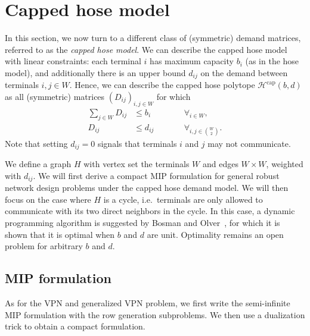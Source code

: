 \section{Capped hose model}
In this section, we now turn to a different class of (symmetric) demand matrices, referred to as the \emph{capped hose model}.
We can describe the capped hose model with linear constraints: each terminal $i$ has maximum capacity $b_i$ (as in the hose model), and additionally there is an upper bound $d_{ij}$ on the demand between terminals $i,j \in W$.
Hence, we can describe the capped hose polytope $\mathcal H^\text{cap}(b, d)$ as all (symmetric) matrices $(D_{ij})_{i,j \in W}$ for which
\[
    \begin{split}
        \sum_{j \in W} D_{ij} &\le b_i \qquad&&\forall_{i \in W}, \\
        D_{ij} &\le d_{ij} \qquad&&\forall_{i,j \in \binom W 2}.
    \end{split}
\]
Note that setting $d_{ij} = 0$ signals that terminals $i$ and $j$ may not communicate.

We define a graph $H$ with vertex set the terminals $W$ and edges $W \times W$, weighted with $d_{ij}$.
We will first derive a compact MIP formulation for general robust network design problems under the capped hose demand model.
We will then focus on the case where $H$ is a cycle, i.e.\ terminals are only allowed to communicate with its two direct neighbors in the cycle.
In this case, a dynamic programming algorithm is suggested by Bosman and Olver~\cite{bosman2017exploring}, for which it is shown that it is optimal when $b$ and $d$ are unit.
Optimality remains an open problem for arbitrary $b$ and $d$.

\subsection{MIP formulation}
As for the VPN and generalized VPN problem, we first write the semi-infinite MIP formulation with the row generation subproblems.
We then use a dualization trick to obtain a compact formulation.

